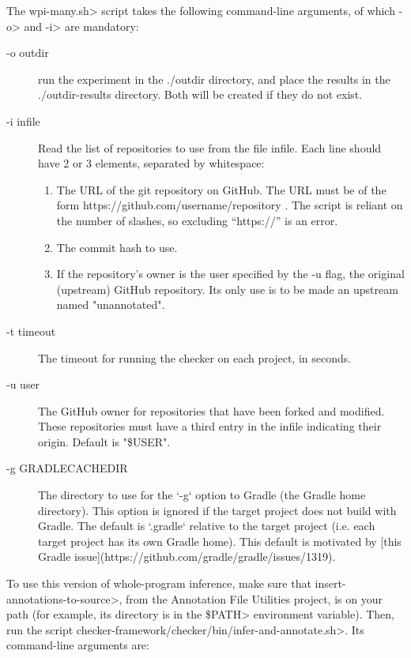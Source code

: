 The \<wpi-many.sh> script takes the following command-line arguments, of
which \<-o> and \<-i> are mandatory:

\begin{description}
\item[-o outdir]
  run the experiment in the ./outdir directory, and place the results in
  the ./outdir-results directory. Both will be created if they do not
  exist.

\item[-i infile]
  Read the list of repositories to use from the file infile. Each line
  should have 2 or 3 elements, separated by whitespace:
  \begin{enumerate}
  \item
    The URL of the git repository on GitHub. The URL must be of the form
    https://github.com/username/repository .  The script is reliant on the
    number of slashes, so excluding ``https://'' is an error.
  \item The commit hash to use.
  \item
    If the repository's owner is the user specified by the -u flag, the
    original (upstream) GitHub repository.  Its only use is to be made an
    upstream named "unannotated".
  \end{enumerate}

\item[-t timeout]
  The timeout for running the checker on each project, in seconds.

\item[-u user]
  The GitHub owner for repositories that have been forked and
  modified. These repositories must have a third entry in the infile
  indicating their origin. Default is "\$USER".

\item[-g GRADLECACHEDIR]
  The directory to use for the `-g` option to Gradle (the Gradle home
  directory). This option is ignored if the target project does not
  build with Gradle. The default is `.gradle` relative to the target
  project (i.e. each target project has its own Gradle home). This default
  is motivated by [this Gradle issue](https://github.com/gradle/gradle/issues/1319).

\end{description}



\begin{sloppypar}
To use this version of whole-program inference, make sure that
\<insert-annotations-to-source>, from the Annotation File Utilities project,
is on your path (for example, its directory is in the \<\$PATH> environment variable).
Then, run the script \<checker-framework/checker/bin/infer-and-annotate.sh>.
Its command-line arguments are:
\end{sloppypar}

